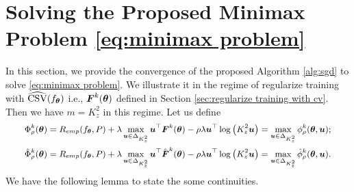 \section{Solving the Proposed Minimax Problem \eqref{eq:minimax problem}}\label{app: solving minimax problem}
In this section, we provide the convergence of the proposed Algorithm \ref{alg:sgd} to solve \eqref{eq:minimax problem}. We illustrate it in the regime of regularize training with $\widehat{\rm{CSV}}(f_{\text{\boldmath{$\theta$}}})$ i.e., $\boldsymbol{F}^{k}(\text{\boldmath{$\theta$}})$ defined in Section \ref{sec:regularize training with cv}. Then we have $m = K_{z}^{2}$ in this regime. Let us define 
\begin{equation}
	\small
	\begin{aligned}
		\Phi^{k}_{\rho}(\btheta)  &= R_{emp}(f_{\btheta}, P) + \lambda\max_{\bu\in\Delta_{K_{z}^{2}}}\bu^{\top}\bF^{k}(\btheta) - \rho\lambda\bu^{\top}\log{\left(K_{z}^{2}\bu\right)} = \max_{\bu\in\Delta_{K_{z}^{2}}}\phi^{k}_{\rho}(\btheta, \bu); \\
		\hat{\Phi}^{k}_{\rho}(\btheta)  &= R_{emp}(f_{\btheta}, P) + \lambda\max_{\bu\in\Delta_{K_{z}^{2}}}\bu^{\top}\hat{\bF}^{k}(\btheta) - \rho\lambda\bu^{\top}\log{\left(K_{z}^{2}\bu\right)} = \max_{\bu\in\Delta_{K_{z}^{2}}}\hat{\phi}^{k}_{\rho}(\btheta, \bu).
	\end{aligned}
\end{equation} 
We have the following lemma to state the some continuities.

